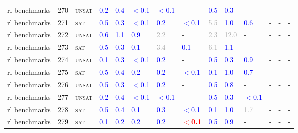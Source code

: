 \begin{center}
{\begin{longtable}{@{}llllllllllllll@{}}
rl benchmarks & 270 & \textsc{unsat} & \textcolor{blue}{0.2} & \textcolor{blue}{0.4} & \textcolor{blue}{$<$0.1} & \textcolor{blue}{$<$0.1} & - & \textcolor{blue}{0.5} & \textcolor{blue}{0.3} & - & - & - & - \\
rl benchmarks & 271 & \textsc{sat} & \textcolor{blue}{0.5} & \textcolor{blue}{0.3} & \textcolor{blue}{$<$0.1} & \textcolor{blue}{0.2} & \textcolor{blue}{$<$0.1} & \textcolor{darkgray}{5.5} & \textcolor{blue}{1.0} & \textcolor{blue}{0.6} & - & - & - \\
rl benchmarks & 272 & \textsc{unsat} & \textcolor{blue}{0.6} & \textcolor{blue}{1.1} & \textcolor{blue}{0.9} & \textcolor{darkgray}{2.2} & - & \textcolor{darkgray}{2.3} & \textcolor{darkgray}{12.0} & - & - & - & - \\
rl benchmarks & 273 & \textsc{sat} & \textcolor{blue}{0.5} & \textcolor{blue}{0.3} & \textcolor{blue}{0.1} & \textcolor{darkgray}{3.4} & \textcolor{blue}{0.1} & \textcolor{darkgray}{6.1} & \textcolor{blue}{1.1} & - & - & - & - \\
rl benchmarks & 274 & \textsc{unsat} & \textcolor{blue}{0.1} & \textcolor{blue}{0.3} & \textcolor{blue}{$<$0.1} & \textcolor{blue}{0.2} & - & \textcolor{blue}{0.5} & \textcolor{blue}{0.3} & \textcolor{blue}{0.9} & - & - & - \\
rl benchmarks & 275 & \textsc{sat} & \textcolor{blue}{0.5} & \textcolor{blue}{0.4} & \textcolor{blue}{0.2} & \textcolor{blue}{0.2} & \textcolor{blue}{$<$0.1} & \textcolor{blue}{0.1} & \textcolor{blue}{1.0} & \textcolor{blue}{0.7} & - & - & - \\
rl benchmarks & 276 & \textsc{unsat} & \textcolor{blue}{0.5} & \textcolor{blue}{0.3} & \textcolor{blue}{$<$0.1} & \textcolor{blue}{0.2} & - & \textcolor{blue}{0.5} & \textcolor{blue}{0.8} & - & - & - & - \\
rl benchmarks & 277 & \textsc{unsat} & \textcolor{blue}{0.2} & \textcolor{blue}{0.4} & \textcolor{blue}{$<$0.1} & \textcolor{blue}{$<$0.1} & - & \textcolor{blue}{0.5} & \textcolor{blue}{0.3} & \textcolor{blue}{$<$0.1} & - & - & - \\
rl benchmarks & 278 & \textsc{sat} & \textcolor{blue}{0.5} & \textcolor{blue}{0.4} & \textcolor{blue}{0.1} & \textcolor{blue}{0.3} & \textcolor{blue}{$<$0.1} & \textcolor{blue}{0.1} & \textcolor{blue}{1.0} & \textcolor{darkgray}{1.7} & - & - & - \\
rl benchmarks & 279 & \textsc{sat} & \textcolor{blue}{0.1} & \textcolor{blue}{0.2} & \textcolor{blue}{0.2} & \textcolor{blue}{0.2} & \textbf{\textcolor{red}{$<$0.1}} & \textcolor{blue}{0.5} & \textcolor{blue}{0.9} & - & - & - & - \\

\end{longtable}}
\end{center}

